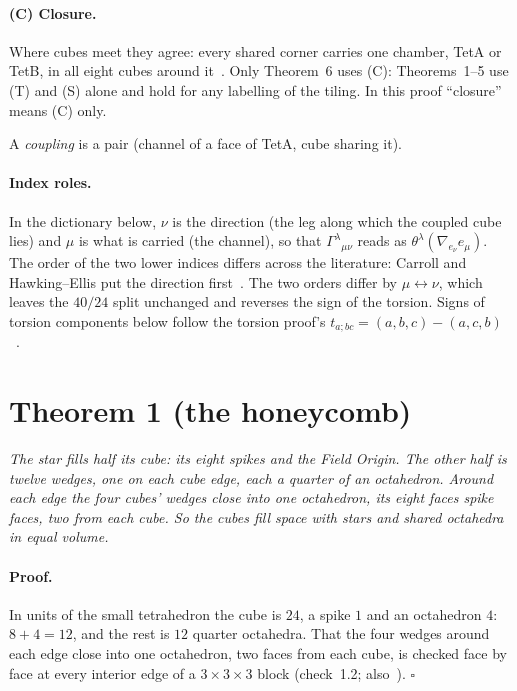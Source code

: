 \documentclass[twocolumn]{iopjournal}
\begin{document}
\paragraph{(C) Closure.} Where cubes meet they agree: every shared
corner carries one chamber, TetA or TetB, in all eight cubes
around it~\cite{NelsonI,NelsonTiling}. Only Theorem~6 uses (C):
Theorems~1--5 use (T) and (S) alone and hold for any labelling of the
tiling. In this proof ``closure'' means (C) only.

\medskip\noindent
A \emph{coupling} is a pair (channel of a face of TetA, cube sharing
it).

\paragraph{Index roles.} In the dictionary below, $\nu$ is the
direction (the leg along which the coupled cube lies) and $\mu$ is
what is carried (the channel), so that
$\Gamma^\lambda{}_{\mu\nu}$ reads as
$\theta^\lambda(\nabla_{e_\nu} e_\mu)$. The order of the two lower
indices differs across the literature: Carroll and Hawking--Ellis put
the direction first~\cite{Carroll,HawkingEllis}. The two orders
differ by $\mu \leftrightarrow \nu$, which leaves the $40/24$ split
unchanged and reverses the sign of the torsion. Signs of torsion
components below follow the torsion proof's
$t_{a;bc} = (a,b,c) - (a,c,b)$~\cite{NelsonTorsion}.


\section*{Theorem 1 (the honeycomb)}

\emph{The star fills half its cube: its eight spikes and the Field
Origin. The other half is twelve wedges, one on each cube edge, each
a quarter of an octahedron. Around each edge the four cubes' wedges
close into one octahedron, its eight faces spike faces, two from
each cube. So the cubes fill space with stars and shared octahedra in
equal volume.}

\paragraph{Proof.} In units of the small tetrahedron the cube is
$24$, a spike $1$ and an octahedron $4$: $8 + 4 = 12$, and the rest
is $12$ quarter octahedra. That the four wedges around each edge
close into one octahedron, two faces from each cube, is checked face
by face at every interior edge of a $3 \times 3 \times 3$ block
(check~1.2; also~\cite{NelsonTiling}). \hfill $\square$
\end{document}

